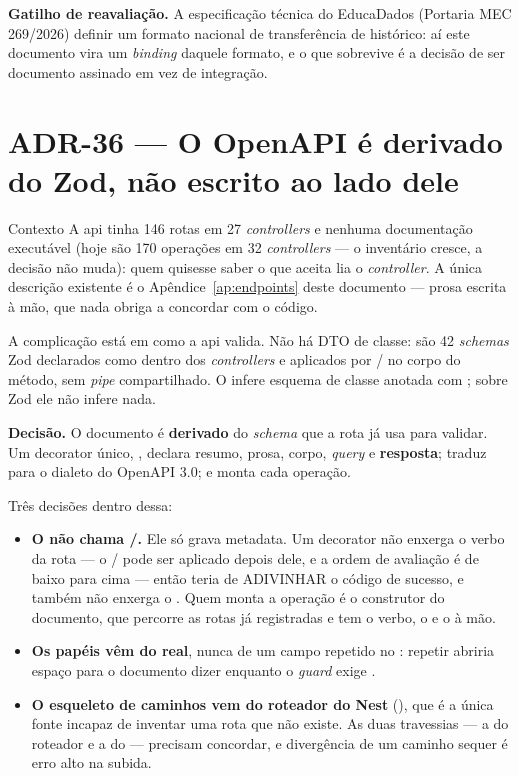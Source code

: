 \textbf{Gatilho de reavaliação.} A especificação técnica do EducaDados (Portaria
MEC 269/2026) definir um formato nacional de transferência de histórico: aí este
documento vira um \emph{binding} daquele formato, e o que sobrevive é a decisão
de ser documento assinado em vez de integração.

\section{ADR-36 --- O OpenAPI é derivado do Zod, não escrito ao lado dele}
\label{adr:openapi-derivado}

\begin{especificacao}{Contexto}
A api tinha 146 rotas em 27 \emph{controllers} e nenhuma documentação executável
(hoje são 170 operações em 32 \emph{controllers} --- o inventário cresce, a
decisão não muda):
quem quisesse saber o que  aceita lia o
\emph{controller}. A única descrição existente é o Apêndice~\ref{ap:endpoints}
deste documento --- prosa escrita à mão, que nada obriga a concordar com o
código.

A complicação está em como a api valida. Não há DTO de classe: são 42
\emph{schemas} Zod declarados como  dentro dos \emph{controllers} e
aplicados por / no corpo do método, sem
\emph{pipe} compartilhado. O  infere esquema de classe
anotada com ; sobre Zod ele não infere nada.
\end{especificacao}

\textbf{Decisão.} O documento é \textbf{derivado} do \emph{schema} que a rota já
usa para validar. Um decorator único, , declara resumo, prosa,
corpo, \emph{query} e \textbf{resposta};  traduz para o
dialeto do OpenAPI 3.0; e  monta cada operação.

Três decisões dentro dessa:

\begin{itemize}
  \item \textbf{O  não chama /.}
    Ele só grava metadata. Um decorator não enxerga o verbo da rota --- o
    / pode ser aplicado depois dele, e a ordem de avaliação é
    de baixo para cima --- então teria de ADIVINHAR o código de sucesso, e
    também não enxerga o . Quem monta a operação é o construtor do
    documento, que percorre as rotas já registradas e tem o verbo, o
     e o  à mão.
  \item \textbf{Os papéis vêm do  real}, nunca de um campo repetido no
    : repetir abriria espaço para o documento dizer
     enquanto o \emph{guard} exige .
  \item \textbf{O esqueleto de caminhos vem do roteador do Nest}
    (), que é a única fonte incapaz de inventar
    uma rota que não existe. As duas travessias --- a do roteador e a do
     --- precisam concordar, e divergência de um caminho
    sequer é erro alto na subida.
\end{itemize}

